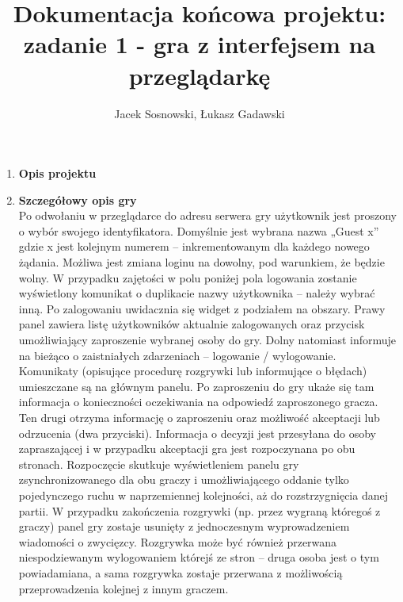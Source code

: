 \documentclass{report}
\author{Jacek Sosnowski, Łukasz Gadawski}
\title{Dokumentacja końcowa projektu: \\
\textbf{zadanie 1 - gra z interfejsem na przeglądarkę}}
\begin{document}
\maketitle

\begin{enumerate}
\item \textbf{Opis projektu} \\
\item \textbf{Szczegółowy opis gry} \\
Po odwołaniu w przeglądarce do adresu serwera gry użytkownik jest proszony o wybór swojego identyfikatora. Domyślnie jest wybrana nazwa „Guest x” gdzie x jest kolejnym numerem – inkrementowanym dla każdego nowego żądania. Możliwa jest zmiana loginu na dowolny, pod warunkiem, że będzie wolny. W przypadku zajętości w polu poniżej pola logowania zostanie wyświetlony komunikat o duplikacie nazwy użytkownika – należy wybrać inną.
Po zalogowaniu uwidacznia się widget z podziałem na obszary. Prawy panel zawiera listę użytkowników aktualnie zalogowanych oraz przycisk umożliwiający zaproszenie wybranej osoby do gry. Dolny natomiast informuje na bieżąco o zaistniałych zdarzeniach – logowanie / wylogowanie.
Komunikaty (opisujące procedurę rozgrywki lub informujące o błędach) umieszczane są na głównym panelu. Po zaproszeniu do gry ukaże się tam informacja o konieczności oczekiwania na odpowiedź zaproszonego gracza. Ten drugi otrzyma informację o zaproszeniu oraz możliwość akceptacji lub odrzucenia (dwa przyciski). Informacja o decyzji jest przesyłana do osoby zapraszającej i w przypadku akceptacji gra jest rozpoczynana po obu stronach.
Rozpoczęcie skutkuje wyświetleniem panelu gry zsynchronizowanego dla obu graczy i umożliwiającego oddanie tylko pojedynczego ruchu w naprzemiennej kolejności, aż do rozstrzygnięcia danej partii.
W przypadku zakończenia rozgrywki (np. przez wygraną któregoś z graczy) panel gry zostaje usunięty z jednoczesnym wyprowadzeniem wiadomości o zwycięzcy. Rozgrywka może być również przerwana niespodziewanym wylogowaniem którejś ze stron – druga osoba jest o tym powiadamiana, a sama rozgrywka zostaje przerwana z możliwością przeprowadzenia kolejnej z innym graczem.



\end{enumerate}
\end{document}
